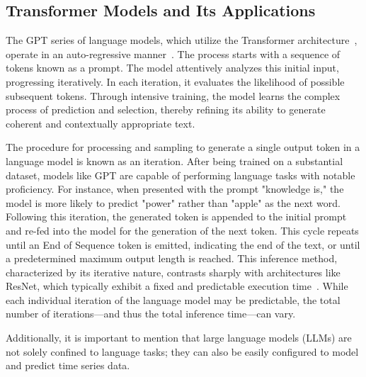 

\subsection{Transformer Models and Its Applications}

The GPT series of language models, which utilize the Transformer architecture~\cite{vaswani2017attention}, operate in an auto-regressive manner~\cite{brown2020language}. The process starts with a sequence of tokens known as a prompt. The model attentively analyzes this initial input, progressing iteratively. In each iteration, it evaluates the likelihood of possible subsequent tokens. Through intensive training, the model learns the complex process of prediction and selection, thereby refining its ability to generate coherent and contextually appropriate text.

The procedure for processing and sampling to generate a single output token in a language model is known as an iteration. After being trained on a substantial dataset, models like GPT are capable of performing language tasks with notable proficiency. For instance, when presented with the prompt "knowledge is," the model is more likely to predict "power" rather than "apple" as the next word. Following this iteration, the generated token is appended to the initial prompt and re-fed into the model for the generation of the next token. This cycle repeats until an End of Sequence token is emitted, indicating the end of the text, or until a predetermined maximum output length is reached. This inference method, characterized by its iterative nature, contrasts sharply with architectures like ResNet, which typically exhibit a fixed and predictable execution time~\cite{gujarati2020serving}. While each individual iteration of the language model may be predictable, the total number of iterations—and thus the total inference time—can vary.

Additionally, it is important to mention that large language models (LLMs) are not solely confined to language tasks; they can also be easily configured to model and predict time series data.

